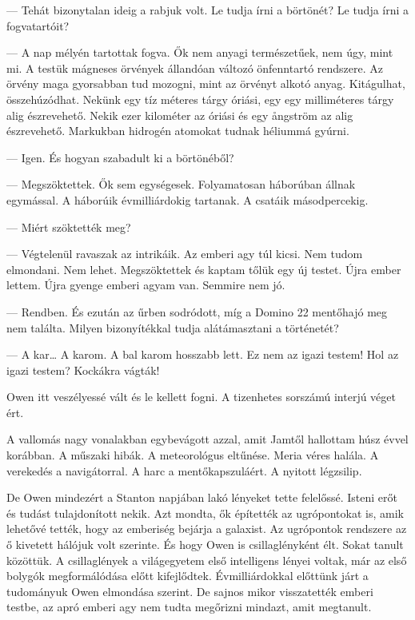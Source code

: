 \documentclass[10pt]{memoir}
\begin{document}
--- Tehát bizonytalan ideig a rabjuk volt. Le tudja írni a börtönét? Le tudja
írni a fogvatartóit?

--- A nap mélyén tartottak fogva. Ők nem anyagi természetűek, nem úgy, mint mi.
A testük mágneses örvények állandóan változó önfenntartó rendszere. Az örvény
maga gyorsabban tud mozogni, mint az örvényt alkotó anyag. Kitágulhat,
összehúzódhat. Nekünk egy tíz méteres tárgy óriási, egy egy milliméteres tárgy
alig észrevehető. Nekik ezer kilométer az óriási és egy ångström az alig
észrevehető. Markukban hidrogén atomokat tudnak héliummá gyúrni.

--- Igen. És hogyan szabadult ki a börtönéből?

--- Megszöktettek. Ők sem egységesek. Folyamatosan háborúban állnak egymással.
A háborúik évmilliárdokig tartanak. A csatáik másodpercekig.

--- Miért szöktették meg?

--- Végtelenül ravaszak az intrikáik. Az emberi agy túl kicsi. Nem tudom
elmondani. Nem lehet. Megszöktettek és kaptam tőlük egy új testet. Újra ember
lettem. Újra gyenge emberi agyam van. Semmire nem jó.

--- Rendben. És ezután az űrben sodródott, míg a Domino 22 mentőhajó meg nem
találta. Milyen bizonyítékkal tudja alátámasztani a történetét?

--- A kar… A karom. A bal karom hosszabb lett. Ez nem az igazi testem! Hol az
igazi testem? Kockákra vágták!

Owen itt veszélyessé vált és le kellett fogni. A tizenhetes sorszámú interjú
véget ért.

A vallomás nagy vonalakban egybevágott azzal, amit Jamtől hallottam húsz évvel
korábban. A műszaki hibák. A meteorológus eltűnése. Meria véres halála. A
verekedés a navigátorral. A harc a mentőkapszuláért. A nyitott légzsilip.

De Owen mindezért a Stanton napjában lakó lényeket tette felelőssé. Isteni erőt
és tudást tulajdonított nekik. Azt mondta, ők építették az ugrópontokat is,
amik lehetővé tették, hogy az emberiség bejárja a galaxist. Az ugrópontok
rendszere az ő kivetett hálójuk volt szerinte. És hogy Owen is csillaglényként
élt. Sokat tanult közöttük. A csillaglények a világegyetem első intelligens
lényei voltak, már az első bolygók megformálódása előtt kifejlődtek.
Évmilliárdokkal előttünk járt a tudományuk Owen elmondása szerint. De sajnos
mikor visszatették emberi testbe, az apró emberi agy nem tudta megőrizni
mindazt, amit megtanult.
\end{document}
